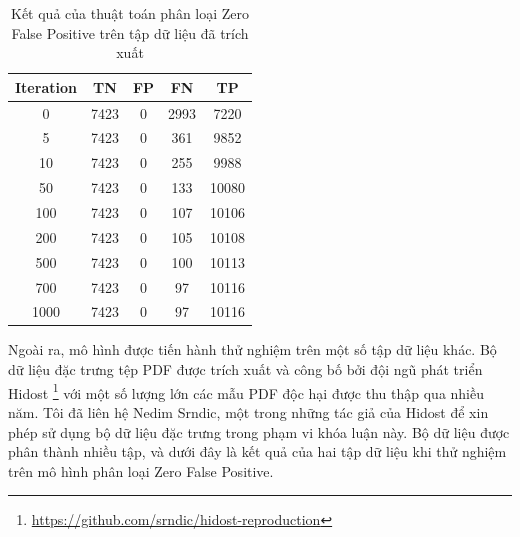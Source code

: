 \documentclass[./../main.tex]{subfiles}
\begin{document}
\begin{table}[]
	\centering
	\caption{Kết quả của thuật toán phân loại Zero False Positive trên tập dữ liệu đã trích xuất}
	\label{tab:ket_qua_thuat_toan_phan_loai}
	\begin{tabular}{|c|c|c|c|c|}
		\hline
		\textbf{Iteration} & \textbf{TN} & \textbf{FP} & \textbf{FN} & \textbf{TP} \\ \hline
		0                  & 7423        & 0           & 2993        & 7220        \\ \hline
		5                  & 7423        & 0           & 361         & 9852        \\ \hline
		10                 & 7423        & 0           & 255         & 9988        \\ \hline
		50                 & 7423        & 0           & 133         & 10080       \\ \hline
		100                & 7423        & 0           & 107         & 10106       \\ \hline
		200                & 7423        & 0           & 105         & 10108       \\ \hline
		500                & 7423        & 0           & 100         & 10113       \\ \hline
		700                & 7423        & 0           & 97          & 10116       \\ \hline
		1000               & 7423        & 0           & 97          & 10116       \\ \hline
	\end{tabular}
\end{table}

Ngoài ra, mô hình được tiến hành thử nghiệm trên một số tập dữ liệu khác. Bộ dữ liệu đặc trưng tệp PDF được trích xuất và công bố bởi đội ngũ phát triển Hidost \footnote{\url{https://github.com/srndic/hidost-reproduction}} với một số lượng lớn các mẫu PDF độc hại được thu thập qua nhiều năm. Tôi đã liên hệ Nedim Srndic, một trong những tác giả của Hidost \cite{hidost} để xin phép sử dụng bộ dữ liệu đặc trưng trong phạm vi khóa luận này. Bộ dữ liệu được phân thành nhiều tập, và dưới đây là kết quả của hai tập dữ liệu khi thử nghiệm trên mô hình phân loại Zero False Positive.
\end{document}
